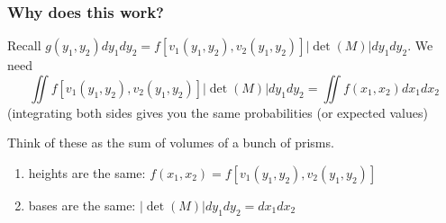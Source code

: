 \documentclass{beamer}
\begin{document}
\begin{frame}
\frametitle{Why does this work?}

Recall $g(y_1,y_2)dy_1dy_2 = f[v_1(y_1,y_2), v_2(y_1, y_2)] |\operatorname{det}(M)|dy_1 dy_2$. We need
\[
\iint f[v_1(y_1,y_2), v_2(y_1, y_2)] |\operatorname{det}(M)|dy_1 dy_2 = \iint f(x_1,x_2)dx_1dx_2
\]
(integrating both sides gives you the same probabilities (or expected values)
\newline

Think of these as the sum of volumes of a bunch of prisms. 
\begin{enumerate}
\item heights are the same: $f(x_1,x_2) = f[v_1(y_1,y_2), v_2(y_1, y_2)]$ 
\item bases are the same: $|\operatorname{det}(M)|dy_1 dy_2 = dx_1dx_2$
\end{enumerate}


\end{frame}
\end{document}
